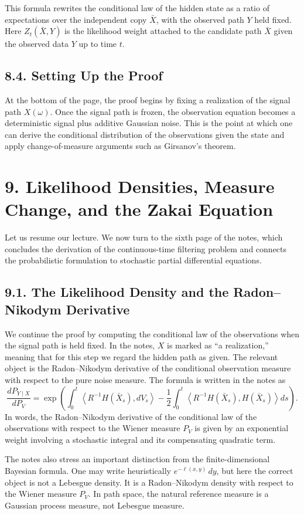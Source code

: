 \documentclass[11pt]{article}
\theoremstyle{definition}
\theoremstyle{remark}
\begin{document}
This formula rewrites the conditional law of the hidden state as a ratio of expectations over the independent copy $\bar X$, with the observed path $Y$ held fixed.
Here $Z_t(\bar X,Y)$ is the likelihood weight attached to the candidate path $\bar X$ given the observed data $Y$ up to time $t$.

\subsection*{8.4. Setting Up the Proof}
At the bottom of the page, the proof begins by fixing a realization of the signal path $X(\omega)$. Once the signal path is frozen, the observation equation becomes a deterministic signal plus additive Gaussian noise. This is the point at which one can derive the conditional distribution of the observations given the state and apply change-of-measure arguments such as Girsanov's theorem.

\section*{9. Likelihood Densities, Measure Change, and the Zakai Equation}
Let us resume our lecture. We now turn to the sixth page of the notes, which concludes the derivation of the continuous-time filtering problem and connects the probabilistic formulation to stochastic partial differential equations.

\subsection*{9.1. The Likelihood Density and the Radon--Nikodym Derivative}
We continue the proof by computing the conditional law of the observations when the signal path is held fixed. In the notes, $X$ is marked as ``a realization,'' meaning that for this step we regard the hidden path as given. The relevant object is the Radon--Nikodym derivative of the conditional observation measure with respect to the pure noise measure. The formula is written in the notes as
\[
\frac{dP_{Y\mid X}}{dP_V}
=
\exp\left(
\int_0^t \left\langle R^{-1}H(\bar X_s),dV_s\right\rangle
-\frac12\int_0^t \left\langle R^{-1}H(\bar X_s),H(\bar X_s)\right\rangle ds
\right).
\]
In words, the Radon--Nikodym derivative of the conditional law of the observations with respect to the Wiener measure $P_V$ is given by an exponential weight involving a stochastic integral and its compensating quadratic term.

The notes also stress an important distinction from the finite-dimensional Bayesian formula. One may write heuristically $e^{-\ell(x,y)}\,dy$, but here the correct object is not a Lebesgue density. It is a Radon--Nikodym density with respect to the Wiener measure $P_V$. In path space, the natural reference measure is a Gaussian process measure, not Lebesgue measure.
\end{document}
